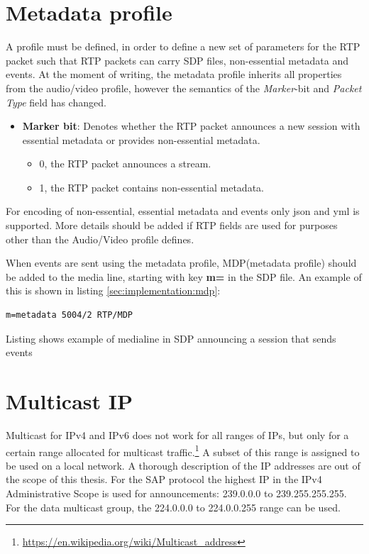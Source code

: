 \section{Metadata profile} \label{sec:implementation:metadataprofile} 
A profile must be defined, in order to define a new set of parameters for the RTP packet such that RTP packets can carry SDP files, non-essential metadata and events. At the moment of writing, the metadata profile inherits all properties from the audio/video profile, however the semantics of the  \textit{Marker}-bit and \textit{Packet Type} field has changed.

\begin{itemize}
	\item \textbf{Marker bit}: Denotes whether the RTP packet announces a new session with essential metadata or provides non-essential metadata.
		\begin{itemize}
			\item 0, the RTP packet announces a stream. 
			\item 1, the RTP packet contains non-essential metadata.
		\end{itemize}
\end{itemize}


For encoding of non-essential, essential metadata and events only json and yml is supported.
More details should be added if RTP fields are used for purposes other than the Audio/Video profile defines.

When events are sent using the metadata profile, MDP(metadata profile) should be added to the media line, starting with key \textbf{m=} in the SDP file. An example of this is shown in listing \ref{sec:implementation:mdp}:

\begin{listing}[h] 
\begin{verbatim}
m=metadata 5004/2 RTP/MDP
\end{verbatim}
\caption{Listing shows example of medialine in SDP announcing a session that sends events}
\label{cmd:implementation:mdp}
\end{listing}

\section{Multicast IP} \label{sec:implementation:multicastip}
Multicast for IPv4 and IPv6 does not work for all ranges of IPs, but only for a certain range allocated for multicast traffic.\footnote{\url{https://en.wikipedia.org/wiki/Multicast\_address}} 
A subset of this range is assigned to be used on a local network. 
A thorough description of the IP addresses are out of the scope of this thesis. 
For the SAP protocol\citep{RFC2974} the highest IP in the IPv4 Administrative Scope is used for announcements: 239.0.0.0 to 239.255.255.255. For the data multicast group, the 224.0.0.0 to 224.0.0.255 range can be used.

